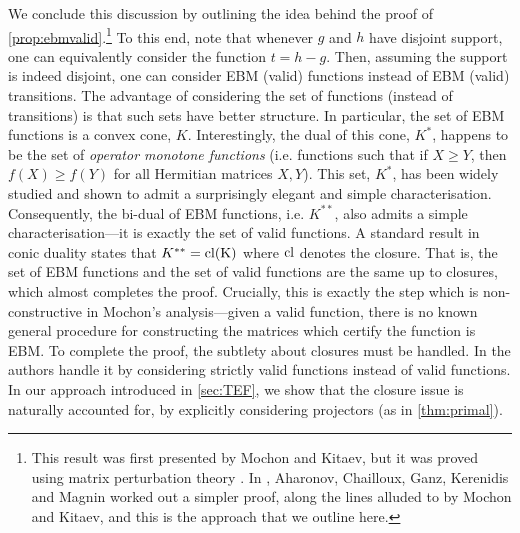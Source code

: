 \documentclass{theoretics}
\begin{document}
We conclude this discussion by outlining the idea behind the proof of \cref{prop:ebmvalid}.\footnote{This result was first presented by Mochon and Kitaev, but it was proved using matrix perturbation theory \cite{Mochon07}. In \cite{ACG+14}, Aharonov, Chailloux,  Ganz,  Kerenidis and Magnin worked out a simpler proof, along the lines alluded to by  Mochon and  Kitaev, and this is the approach that we outline here.}
To this end, note that whenever $g$ and $h$ have disjoint support, one can equivalently consider the function $t=h-g$. Then, assuming the support is indeed disjoint, one can consider EBM (valid) functions instead of EBM (valid) transitions. The advantage of considering the set of functions (instead of transitions) is that such sets have better structure. In particular, the set of EBM functions is a convex cone, $K$. Interestingly, the dual of this cone, $K^*$, happens to be the set of \emph{operator monotone functions} (i.e. functions such that if $X\ge Y$, then $f(X) \ge f(Y)$ for all Hermitian matrices $X,Y$). %
This set, $K^*$, has been widely studied and shown to admit a surprisingly elegant and simple characterisation. Consequently, the bi-dual of EBM functions, i.e. $K^{**}$, also admits a simple characterisation---it is exactly the set of valid functions. A standard result in conic duality \cite{Boyd2004} states that $K^{**}=\rm{cl}(K)$ where $\rm{cl}$ denotes the closure. That is, the set of EBM functions and the set of valid functions are the same up to closures, which almost completes the proof. Crucially, this is exactly the step which is non-constructive in Mochon's analysis---given a valid function, there is no known general procedure for constructing the matrices which certify the function is EBM. To complete the proof, the subtlety about closures must be handled. In \cite{ACG+14} the authors handle it by considering strictly valid functions instead of valid functions. In our approach introduced in \cref{sec:TEF}, we show that the closure issue is naturally accounted for, by explicitly considering projectors (as in \cref{thm:primal}).
%
%


%

%
%
%
%
%
%
%
%
%
%
%
%
%
%
%
%
%


%
%
%
%
%
%
%
%
%

%


%
%
%
%
%
%
%


%
%
%
%
%
%
%
%
%
%

%

%
%
%
%
%
%
%
%
\end{document}
